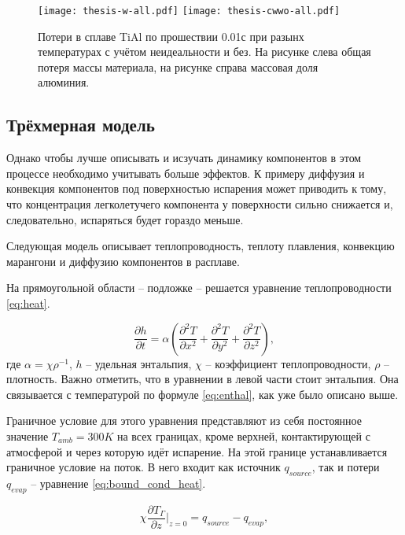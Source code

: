 
\begin{figure}
    \texttt{[image: thesis-w-all.pdf]}\hfill
    \texttt{[image: thesis-cwwo-all.pdf]}\hfill
    \caption{Потери в сплаве TiAl по прошествии 0.01с при разынх температурах с учётом неидеальности и без. На рисунке слева общая потеря массы материала, на рисунке справа массовая доля алюминия.}
    \label{fig:losses-0}
\end{figure}

\subsection{Трёхмерная модель}

Однако чтобы лучше описывать и исзучать динамику компонентов в этом процессе необходимо учитывать больше эффектов. К примеру диффузия и конвекция компонентов под поверхностью испарения может приводить к тому, что концентрация легколетучего компонента у поверхности сильно снижается и, следовательно, испаряться будет гораздо меньше.

Следующая модель описывает теплопроводность, теплоту плавления, конвекцию марангони и диффузию компонентов в расплаве.

На прямоугольной области -- подложке -- решается уравнение теплопроводности \ref{eq:heat}.

\begin{equation}
    \label{eq:heat}
    \frac{\partial h}{\partial t} = \alpha\left(\frac{\partial^2 T}{\partial x^2} + \frac{\partial^2 T}{\partial y^2} + \frac{\partial^2 T}{\partial z^2}\right),
\end{equation}
где $\alpha = \chi \rho^{-1} $, $h$ -- удельная энтальпия, $\chi$ -- коэффициент теплопроводности, $\rho$ -- плотность. Важно отметить, что в уравнении в левой части стоит энтальпия. Она связывается с температурой по формуле \ref{eq:enthal}, как уже было описано выше.

Граничное условие для этого уравнения представляют из себя постоянное значение $T_{amb} = 300K$ на всех границах, кроме верхней, контактирующей с атмосферой и через которую идёт испарение. На этой границе устанавливается граничное условие на поток. В него входит как источник $q_{source}$, так и потери $q_{evap}$ -- уравнение \ref{eq:bound_cond_heat}.

\begin{equation}
    \label{eq:bound_cond_heat}
    \chi \frac{\partial T_{\Gamma}}{\partial z}  \big|_{z=0} = q_{source} - q_{evap},
\end{equation}

